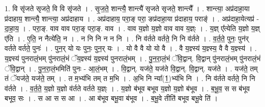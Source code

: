 \documentclass[17pt]{extarticle}
\begin{document}
1. वि सृ॑जते सृजते॒ वि वि सृ॑जते । . सृ॒ज॒ते॒ शान्त्यै॒ शान्त्यै॑ सृजते सृजते॒ शान्त्यै᳚ । . शान्त्या॒ अप्र॑दाहा॒या प्र॑दाहाय॒ शान्त्यै॒ शान्त्या॒ अप्र॑दाहाय । . अप्र॑दाहाय॒ परा॒ङ् परा॒ ङप्र॑दाहा॒या प्र॑दाहाय॒ पराङ्॑ । . अप्र॑दाहा॒येत्यप्र॑ - दा॒हा॒य॒ । . परा॒ङ्. वाव वाव परा॒ङ् परा॒ङ्. वाव । . वाव य॒ज्ञो य॒ज्ञो वाव वाव य॒ज्ञ्ः । . य॒ज्ञ् ए᳚त्येति य॒ज्ञो य॒ज्ञ् ए॑ति । . ए॒ति॒ न नैत्ये॑ति॒ न । . न नि नि न न नि । . नि व॑र्तते वर्तते॒ नि नि व॑र्तते । . व॒र्त॒ते॒ पुनः॒ पुन॑र् वर्तते वर्तते॒ पुनः॑ । . पुन॒र् यो यः पुनः॒ पुन॒र् यः । . यो वै वै यो यो वै । . वै य॒ज्ञ्स्य॑ य॒ज्ञ्स्य॒ वै वै य॒ज्ञ्स्य॑ । . य॒ज्ञ्स्य॑ पुनरालं॒भम् पु॑नरालं॒भं ॅय॒ज्ञ्स्य॑ य॒ज्ञ्स्य॑ पुनरालं॒भम् । . पु॒न॒रा॒लं॒भं ॅवि॒द्वान्. वि॒द्वान् पु॑नरालं॒भम् पु॑नरालं॒भं ॅवि॒द्वान् । . पु॒न॒रा॒लं॒भमिति॑ पुनः - आ॒लं॒भम् । . वि॒द्वान्. यज॑ते॒ यज॑ते वि॒द्वान्. वि॒द्वान्. यज॑ते । . यज॑ते॒ तम् तं ॅयज॑ते॒ यज॑ते॒ तम् । . त म॒भ्य॑भि तम् त म॒भि । . अ॒भि नि न्या᳚(1॒)भ्य॑भि नि । . नि व॑र्तते वर्तते॒ नि नि व॑र्तते । . व॒र्त॒ते॒ य॒ज्ञो य॒ज्ञो व॑र्तते वर्तते य॒ज्ञ्ः । . य॒ज्ञो ब॑भूव बभूव य॒ज्ञो य॒ज्ञो ब॑भूव । . ब॒भू॒व॒ स स ब॑भूव बभूव॒ सः । . स आ स स आ । . आ ब॑भूव बभू॒वा ब॑भूव । . ब॒भू॒वे तीति॑ बभूव बभू॒वे ति॑ । \newline
\end{document}

